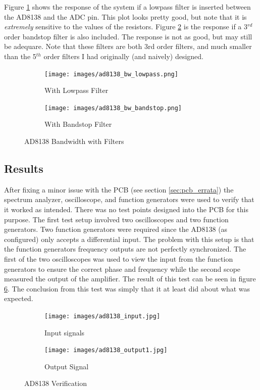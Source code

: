 \documentclass[a4paper, 12pt, notitlepage]{article}
\begin{document}
Figure \ref{fig:ad8138_bw_lowpass} shows the response of the system if a lowpass filter is inserted between the AD8138 and the ADC pin.  This plot looks pretty good, but note that it is \textit{extremely} sensitive to the values of the resistors.  Figure \ref{fig:ad8138_bw_bandstop} is the response if a 3$^{rd}$ order bandstop filter is also included.  The response is not as good, but may still be adequare.  Note that these filters are both 3rd order filters, and much smaller than the 5$^{th}$ order filters I had originally (and naively) designed.

\begin{figure}[ht]
\centering
\begin{subfigure}[b]{0.45\textwidth}
  \texttt{[image: images/ad8138\_bw\_lowpass.png]}
  \caption{With Lowpass Filter}
  \label{fig:ad8138_bw_lowpass}
\end{subfigure}
\begin{subfigure}[b]{0.45\textwidth}
  \texttt{[image: images/ad8138\_bw\_bandstop.png]}
  \caption{With Bandstop Filter}
  \label{fig:ad8138_bw_bandstop}
\end{subfigure}

\caption{AD8138 Bandwidth with Filters}
\label{fig:ad8138_bw_filters}
\end{figure}

\subsection{Results}
After fixing a minor issue with the PCB (see section \ref{sec:pcb_errata}) the spectrum analyzer, oscilloscope, and function generators were used to verify that it worked as intended.  There was no test points designed into the PCB for this purpose.  The first test setup involved two oscilloscopes and two function generators.  Two function generators were required since the AD8138 (as configured) only accepts a differential input.  The problem with this setup is that the function generators frequency outputs are not perfectly synchronized.  The first of the two oscilloscopes was used to view the input from the function generators to ensure the correct phase and frequency while the second scope measured the output of the amplifier.  The result of this test can be seen in figure \ref{fig:ad8138_test1}.  The conclusion from this test was simply that it at least did about what was expected.

\begin{figure}[ht]
\centering
\begin{subfigure}[b]{0.45\textwidth}
  \texttt{[image: images/ad8138\_input.jpg]}
  \caption{Input signals}
  \label{fig:ad8138_test1_input}
\end{subfigure}
\begin{subfigure}[b]{0.45\textwidth}
  \texttt{[image: images/ad8138\_output1.jpg]}
  \caption{Output Signal}
  \label{fig:ad8138_test1_output}
\end{subfigure}


\caption{AD8138 Verification}
\label{fig:ad8138_test1}
\end{figure}
\end{document}
